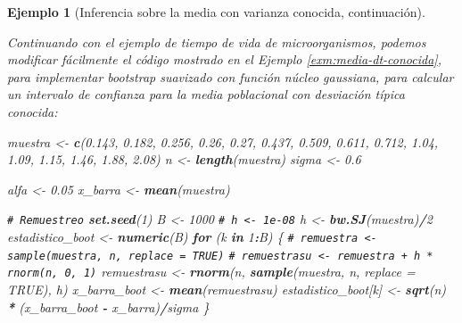 \documentclass[
]{book}
\newenvironment{Shaded}{\begin{snugshade}}{\end{snugshade}}
\newcommand{\AttributeTok}[1]{\textcolor[rgb]{0.13,0.29,0.53}{#1}}
\newcommand{\CommentTok}[1]{\textcolor[rgb]{0.56,0.35,0.01}{\textit{#1}}}
\newcommand{\ConstantTok}[1]{\textcolor[rgb]{0.56,0.35,0.01}{#1}}
\newcommand{\ControlFlowTok}[1]{\textcolor[rgb]{0.13,0.29,0.53}{\textbf{#1}}}
\newcommand{\DecValTok}[1]{\textcolor[rgb]{0.00,0.00,0.81}{#1}}
\newcommand{\FloatTok}[1]{\textcolor[rgb]{0.00,0.00,0.81}{#1}}
\newcommand{\FunctionTok}[1]{\textcolor[rgb]{0.13,0.29,0.53}{\textbf{#1}}}
\newcommand{\NormalTok}[1]{#1}
\newcommand{\OtherTok}[1]{\textcolor[rgb]{0.56,0.35,0.01}{#1}}
\newcommand{\SpecialCharTok}[1]{\textcolor[rgb]{0.81,0.36,0.00}{\textbf{#1}}}
\theoremstyle{break}
\newtheorem{example}{Ejemplo}[chapter]
\theoremstyle{nonumberplain}
\renewcommand{\CommentTok}[1]{\textcolor[rgb]{0.41,0.41,0.41}{\texttt{#1}}}
\begin{document}
\begin{example}[Inferencia sobre la media con varianza conocida, continuación]
\protect\hypertarget{exm:media-dt-conocida-suav}{}\label{exm:media-dt-conocida-suav}

Continuando con el ejemplo de tiempo de vida de microorganismos,
podemos modificar fácilmente el código mostrado en el Ejemplo \ref{exm:media-dt-conocida}, para implementar bootstrap suavizado
con función núcleo gaussiana, para calcular un intervalo de confianza
para la media poblacional con desviación típica conocida:

\begin{Shaded}
\begin{Highlighting}[]
\NormalTok{muestra }\OtherTok{\textless{}{-}} \FunctionTok{c}\NormalTok{(}\FloatTok{0.143}\NormalTok{, }\FloatTok{0.182}\NormalTok{, }\FloatTok{0.256}\NormalTok{, }\FloatTok{0.26}\NormalTok{, }\FloatTok{0.27}\NormalTok{, }\FloatTok{0.437}\NormalTok{, }\FloatTok{0.509}\NormalTok{, }
             \FloatTok{0.611}\NormalTok{, }\FloatTok{0.712}\NormalTok{, }\FloatTok{1.04}\NormalTok{, }\FloatTok{1.09}\NormalTok{, }\FloatTok{1.15}\NormalTok{, }\FloatTok{1.46}\NormalTok{, }\FloatTok{1.88}\NormalTok{, }\FloatTok{2.08}\NormalTok{)}
\NormalTok{n }\OtherTok{\textless{}{-}} \FunctionTok{length}\NormalTok{(muestra)}
\NormalTok{sigma }\OtherTok{\textless{}{-}} \FloatTok{0.6}

\NormalTok{alfa }\OtherTok{\textless{}{-}} \FloatTok{0.05}
\NormalTok{x\_barra }\OtherTok{\textless{}{-}} \FunctionTok{mean}\NormalTok{(muestra)}

\CommentTok{\# Remuestreo}
\FunctionTok{set.seed}\NormalTok{(}\DecValTok{1}\NormalTok{)}
\NormalTok{B }\OtherTok{\textless{}{-}} \DecValTok{1000}
\CommentTok{\# h \textless{}{-} 1e{-}08}
\NormalTok{h }\OtherTok{\textless{}{-}} \FunctionTok{bw.SJ}\NormalTok{(muestra)}\SpecialCharTok{/}\DecValTok{2}
\NormalTok{estadistico\_boot }\OtherTok{\textless{}{-}} \FunctionTok{numeric}\NormalTok{(B)}
\ControlFlowTok{for}\NormalTok{ (k }\ControlFlowTok{in} \DecValTok{1}\SpecialCharTok{:}\NormalTok{B) \{}
    \CommentTok{\# remuestra \textless{}{-} sample(muestra, n, replace = TRUE)}
    \CommentTok{\# remuestrasu \textless{}{-} remuestra + h * rnorm(n, 0, 1)}
\NormalTok{    remuestrasu }\OtherTok{\textless{}{-}} \FunctionTok{rnorm}\NormalTok{(n, }\FunctionTok{sample}\NormalTok{(muestra, n, }\AttributeTok{replace =} \ConstantTok{TRUE}\NormalTok{), h)}
\NormalTok{    x\_barra\_boot }\OtherTok{\textless{}{-}} \FunctionTok{mean}\NormalTok{(remuestrasu)}
\NormalTok{    estadistico\_boot[k] }\OtherTok{\textless{}{-}} \FunctionTok{sqrt}\NormalTok{(n) }\SpecialCharTok{*}\NormalTok{ (x\_barra\_boot }\SpecialCharTok{{-}}\NormalTok{ x\_barra)}\SpecialCharTok{/}\NormalTok{sigma}
\NormalTok{\}}


\end{Highlighting}
\end{Shaded}
\end{example}
\end{document}
